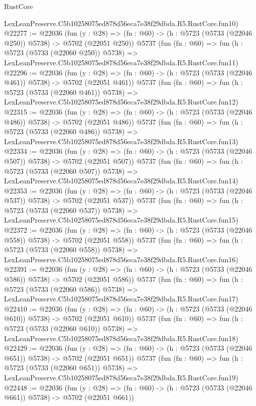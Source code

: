 \begin{lexlean}{RustCore}
\begin{coremodule}
    LexLeanPreserve.C5b10258075ed878d56eca7e38f29dbda.R5.RustCore.fun10)
@22277 := @22036
    (fun (y : @28) => (fn : @60) -> (h : @5723 (@5733 (@22046 @250)) @5738) -> @5702 (@22051 @250))
    @5737
    (fun (fn : @60) =>
    fun (h : @5723 (@5733 (@22060 @250)) @5738) =>
    LexLeanPreserve.C5b10258075ed878d56eca7e38f29dbda.R5.RustCore.fun11)
@22296 := @22036
    (fun (y : @28) => (fn : @60) -> (h : @5723 (@5733 (@22046 @461)) @5738) -> @5702 (@22051 @461))
    @5737
    (fun (fn : @60) =>
    fun (h : @5723 (@5733 (@22060 @461)) @5738) =>
    LexLeanPreserve.C5b10258075ed878d56eca7e38f29dbda.R5.RustCore.fun12)
@22315 := @22036
    (fun (y : @28) => (fn : @60) -> (h : @5723 (@5733 (@22046 @486)) @5738) -> @5702 (@22051 @486))
    @5737
    (fun (fn : @60) =>
    fun (h : @5723 (@5733 (@22060 @486)) @5738) =>
    LexLeanPreserve.C5b10258075ed878d56eca7e38f29dbda.R5.RustCore.fun13)
@22334 := @22036
    (fun (y : @28) => (fn : @60) -> (h : @5723 (@5733 (@22046 @507)) @5738) -> @5702 (@22051 @507))
    @5737
    (fun (fn : @60) =>
    fun (h : @5723 (@5733 (@22060 @507)) @5738) =>
    LexLeanPreserve.C5b10258075ed878d56eca7e38f29dbda.R5.RustCore.fun14)
@22353 := @22036
    (fun (y : @28) => (fn : @60) -> (h : @5723 (@5733 (@22046 @537)) @5738) -> @5702 (@22051 @537))
    @5737
    (fun (fn : @60) =>
    fun (h : @5723 (@5733 (@22060 @537)) @5738) =>
    LexLeanPreserve.C5b10258075ed878d56eca7e38f29dbda.R5.RustCore.fun15)
@22372 := @22036
    (fun (y : @28) => (fn : @60) -> (h : @5723 (@5733 (@22046 @558)) @5738) -> @5702 (@22051 @558))
    @5737
    (fun (fn : @60) =>
    fun (h : @5723 (@5733 (@22060 @558)) @5738) =>
    LexLeanPreserve.C5b10258075ed878d56eca7e38f29dbda.R5.RustCore.fun16)
@22391 := @22036
    (fun (y : @28) => (fn : @60) -> (h : @5723 (@5733 (@22046 @586)) @5738) -> @5702 (@22051 @586))
    @5737
    (fun (fn : @60) =>
    fun (h : @5723 (@5733 (@22060 @586)) @5738) =>
    LexLeanPreserve.C5b10258075ed878d56eca7e38f29dbda.R5.RustCore.fun17)
@22410 := @22036
    (fun (y : @28) => (fn : @60) -> (h : @5723 (@5733 (@22046 @610)) @5738) -> @5702 (@22051 @610))
    @5737
    (fun (fn : @60) =>
    fun (h : @5723 (@5733 (@22060 @610)) @5738) =>
    LexLeanPreserve.C5b10258075ed878d56eca7e38f29dbda.R5.RustCore.fun18)
@22429 := @22036
    (fun (y : @28) => (fn : @60) -> (h : @5723 (@5733 (@22046 @651)) @5738) -> @5702 (@22051 @651))
    @5737
    (fun (fn : @60) =>
    fun (h : @5723 (@5733 (@22060 @651)) @5738) =>
    LexLeanPreserve.C5b10258075ed878d56eca7e38f29dbda.R5.RustCore.fun19)
@22448 := @22036
    (fun (y : @28) => (fn : @60) -> (h : @5723 (@5733 (@22046 @661)) @5738) -> @5702 (@22051 @661))

\end{coremodule}
\end{lexlean}
